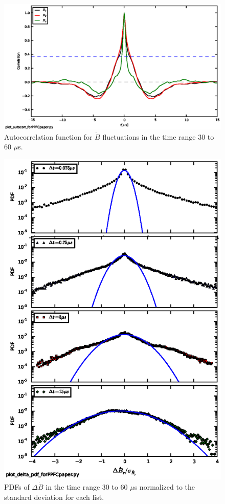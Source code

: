 \documentclass[12pt]{iopart}
\begin{document}
\begin{figure}[!htbp]
\centerline{
\includegraphics[width=16cm]{autocorr.eps}}
\caption{\label{fig:autocorr} Autocorrelation function for $\dot{B}$ fluctuations in the time range 30 to 60 $\mu$s.}
\end{figure}
\begin{figure}[!htbp]
\centerline{
\includegraphics[width=15cm]{pdfs.eps}}
\caption{\label{fig:pdfs} PDFs of $\Delta \dot{B}$ in the time range 30 to 60 $\mu$s normalized to the standard deviation for each list.}
\end{figure}
\end{document}
